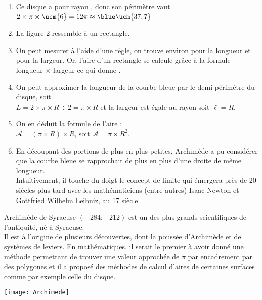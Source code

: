 \begin{colonne*exercice}
\begin{corrige}
\begin{enumerate}
   \item Ce disque a pour rayon , donc son périmètre vaut $2\times\pi\times\ucm{6} =12\pi \approx{\blue \ucm{37,7}}$.
   \item {\blue La figure 2 \og ressemble \fg{} à un rectangle}.
   \item On peut mesurer à l'aide d'une règle, on trouve environ  pour la longueur et  pour la largeur. Or, l'aire d'un rectangle se calcule grâce à la formule \og longueur $\times$ largeur \fg{} ce qui donne {\blue {}}.
   \item On peut approximer la longueur de la courbe bleue par le demi-périmètre du disque, soit \\
      {\blue $L =2\times\pi\times R\div2 =\pi\times R$} et la largeur est égale au rayon soit {\blue $\ell =R$}.
   \item On en déduit la formule de l'aire : \\
      $\mathcal{A} =(\pi\times R)\times R$, soit {\blue $\mathcal{A} =\pi\times R^2$}.
   \item En découpant des portions de plus en plus petites, Archimède a pu considérer que la courbe bleue se rapprochait de plus en plus d'une droite de même longueur. \\
      Intuitivement, il touche du doigt le concept de limite qui émergera près de 20 siècles plus tard avec les mathématiciens (entre autres) Isaac Newton et Gottfried Wilhelm Leibniz, au 17 siècle.
\end{enumerate}

\end{corrige}

\end{colonne*exercice}



\Recreation

\vspace*{-5mm}


    \smallskip
      \begin{minipage}{11cm}
         Archimède de Syracuse $(-284 ; -212)$ est un des plus grands scientifiques de l'antiquité, né à Syracuse. \\
         Il est à l'origine de plusieurs découvertes, dont la poussée d'Archimède et de systèmes de leviers. En mathématiques, il serait le premier à avoir donné une méthode permettant de trouver une valeur approchée de $\pi$ par encadrement par des polygones et il a proposé des méthodes de calcul d'aires de certaines surfaces comme par exemple celle du disque.
      \end{minipage}
      \qquad
      \begin{minipage}{3cm}
         \texttt{[image: Archimede]}
      \end{minipage}
      
